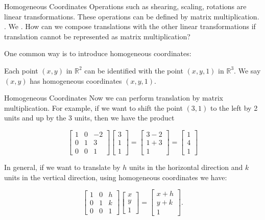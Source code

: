 \documentclass[xcolor=dvipsnames,aspectratio=169,t]{beamer}
\begin{document}
\begin{frame}{Homogeneous Coordinates}
  \bi
  \ii Operations such as shearing, scaling, rotations are \alert{linear transformations}.
  \bi
    \ii [$\circ$] These operations can be defined by \alert{matrix multiplication}.
  \ei
  \pause
  \ii {}. We .
  \ii How can we compose translations with the other linear transformations if translation cannot be represented as matrix multiplication?
  \ei
  
  \pause
  \bbox
  One common way is to introduce \alert{homogeneous coordinates}:

  \bi
  \ii Each point $(x,y)$ in $\mathbb{R}^2$ can be identified with the point $(x,y,1)$ in $\mathbb{R}^3$.
  \ii We say $(x,y)$ has homogeneous coordinates $(x,y,1)$.
  \ei
  \ebox

\end{frame}

\begin{frame}{Homogeneous Coordinates}
  Now we can perform translation by matrix multiplication. For example, if we want to shift the point $(3,1)$ to the left by 2 units and up by the 3 units, then we have the product

  \[ \begin{bmatrix}1 & 0 & -2\\ 0 & 1 & 3 \\ 0 & 0 & 1\end{bmatrix} \begin{bmatrix}3 \\ 1\\ 1 \end{bmatrix} = \begin{bmatrix} 3-2 \\ 1+3 \\ 1 \end{bmatrix} = \begin{bmatrix}1\\4\\1 \end{bmatrix}\]
  \medskip

  \pause
  \bbox
  In general, if we want to translate by $h$ units in the horizontal direction and $k$ units in the vertical direction, using homogeneous coordinates we have:

  \[ \begin{bmatrix} 1 & 0 & h \\ 0 & 1 & k \\ 0 & 0 & 1 \end{bmatrix} \begin{bmatrix}x \\ y \\ 1 \end{bmatrix} = \begin{bmatrix} x+h \\ y+k \\ 1 \end{bmatrix}.\]
  \ebox
\end{frame}
\end{document}
